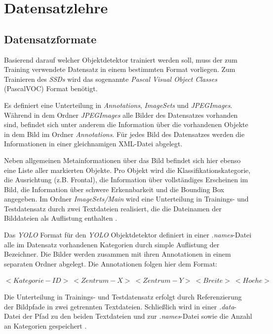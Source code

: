 \section{Datensatzlehre}

\subsection*{Datensatzformate}

Basierend darauf welcher Objektdetektor trainiert werden soll, muss der zum Training verwendete Datensatz in einem bestimmten Format vorliegen. Zum Trainieren des \textit{SSDs} wird das sogenannte \textit{Pascal Visual Object Classes} (PascalVOC) Format benötigt. 

Es definiert eine Unterteilung in \textit{Annotations}, \textit{ImageSets} und \textit{JPEGImages}. Während in dem Ordner \textit{JPEGImages} alle Bilder des Datensatzes vorhanden sind, befindet sich unter anderem die Information über die vorhandenen Objekte in dem Bild im Ordner \textit{Annotations}. Für jedes Bild des Datensatzes werden die Informationen in einer gleichnamigen XML-Datei abgelegt. 

\lstset{language=XML}


Neben allgemeinen Metainformationen über das Bild befindet sich hier ebenso eine Liste aller markierten Objekte. Pro Objekt wird die Klassifikationskategorie, die Ausrichtung (z.B. \glqq Frontal\grqq{}), die Information über vollständiges Erscheinen im Bild, die Information über schwere Erkennbarkeit und die Bounding Box angegeben. Im Ordner \textit{ImageSets/Main} wird eine Unterteilung in Trainings- und Testdatensatz durch zwei Textdateien realisiert, die die Dateinamen der Bilddateien als Auflistung enthalten \cite{RenuKhandelwal.2019}. 

Das \textit{YOLO} Format für den \textit{YOLO} Objektdetektor definiert in einer \textit{.names}-Datei alle im Datensatz vorhandenen Kategorien durch simple Auflistung der Bezeichner. Die Bilder werden zusammen mit ihren Annotationen in einem separaten Ordner abgelegt. Die Annotationen folgen hier dem Format:

$<Kategorie-ID>\:<Zentrum-X>\:<Zentrum-Y>\:<Breite>\:<Hoehe>$

Die Unterteilung in Trainings- und Testdatensatz erfolgt durch Referenzierung der Bildpfade in zwei getrennten Textdateien. Schließlich wird in einer \textit{.data}-Datei der Pfad zu den beiden Textdateien und zur \textit{.names}-Datei sowie die Anzahl an Kategorien gespeichert \cite{ArunPonnusamy.20191006}. 

